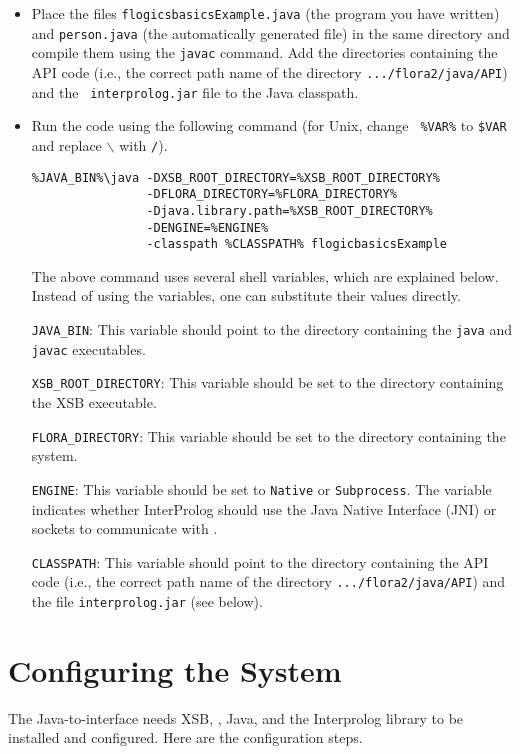 \begin{itemize}
\item Place the files {\tt flogicsbasicsExample.java} (the program you have
  written) and {\tt person.java} (the automatically generated file)
in the same directory and compile them using the {\tt javac}  command. Add
the directories containing the API code (i.e., the correct path name of the
directory {\tt .../flora2/java/API}) and the {\tt
interprolog.jar} file to the Java classpath.


\item Run the code using the following command (for Unix, change {\tt
    \%VAR\%} to {\tt \$VAR} and replace $\backslash$ with {\tt /}).
\begin{verbatim}
%JAVA_BIN%\java -DXSB_ROOT_DIRECTORY=%XSB_ROOT_DIRECTORY%
                -DFLORA_DIRECTORY=%FLORA_DIRECTORY%
                -Djava.library.path=%XSB_ROOT_DIRECTORY%
                -DENGINE=%ENGINE%
                -classpath %CLASSPATH% flogicbasicsExample
\end{verbatim}

  The above command uses several shell variables, which are explained below.
  Instead of using the variables, one can substitute their values directly.

{\tt JAVA\_BIN}: This variable should point to the directory
containing the {\tt java}  and {\tt javac}  executables.

{\tt XSB\_ROOT\_DIRECTORY}: This variable should be set to the
directory containing the XSB executable.

{\tt FLORA\_DIRECTORY}: This variable should be set to the directory
containing the \FLORA system.

{\tt ENGINE}: This variable should be set to
{\tt Native} or  {\tt Subprocess}. The variable indicates whether InterProlog
should use the Java Native Interface (JNI) or sockets to communicate with \FLORA.

{\tt CLASSPATH}: This variable should point to the directory
containing the API code (i.e., the correct path name of the
directory {\tt .../flora2/java/API})  and the file {\tt interprolog.jar}
(see below).

\end{itemize}

\section{Configuring the System}
The Java-to-\FLORA interface needs XSB, \FLORA, Java, and the
Interprolog library to be installed and configured. Here are the
configuration steps.

